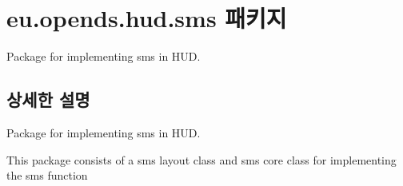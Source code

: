 \hypertarget{namespaceeu_1_1opends_1_1hud_1_1sms}{}\section{eu.\+opends.\+hud.\+sms 패키지}
\label{namespaceeu_1_1opends_1_1hud_1_1sms}


Package for implementing sms in H\+U\+D.  




\subsection{상세한 설명}
Package for implementing sms in H\+U\+D. 

This package consists of a sms layout class and sms core class for implementing the sms function 